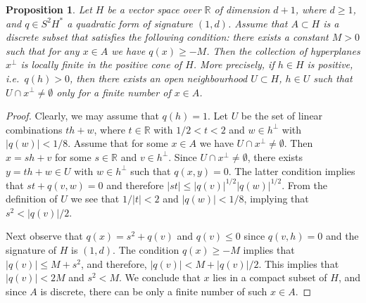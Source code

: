 \documentclass[11pt]{article}
\newcommand{\6}{\partial}
\newcommand{\bbR}{\mathbb{R}}
\renewcommand{\ge}{\geqslant}
\renewcommand{\le}{\leqslant}
\newcommand{\st}{\enskip |\enskip}
\newtheorem{prop}[defn]{Proposition}
\begin{document}
\begin{prop}\label{prop_loc_fin}
Let $H$ be a vector space over $\bbR$ of dimension $d+1$, where $d \ge 1$, and
$q\in S^2H^*$ a quadratic form of signature $(1,d)$. Assume that $A\subset H$
is a discrete subset that satisfies the following condition: there exists a constant
$M > 0$ such that for any $x\in A$ we have $q(x) \ge -M$.
Then the collection of hyperplanes $x^\perp$ is locally finite in the positive cone
of $H$. More precisely, if $h\in H$ is positive, i.e.\ $q(h)>0$, then there exists
an open neighbourhood $U\subset H$, $h\in U$ such that $U\cap x^\perp\neq\emptyset$
only for a finite number of $x\in A$.
\end{prop}
\begin{proof}
Clearly, we may assume that $q(h)=1$. Let $U$ be the set of linear
combinations $t h + w$, where $t\in \bbR$ with $1/2 < t < 2$ and $w\in h^\perp$ with $|q(w)| < 1/8$.
Assume that for some $x\in A$ we have $U\cap x^\perp\neq \emptyset$. Then
$x = sh+v$ for some $s\in\bbR$ and $v\in h^\perp$. Since $U\cap x^\perp\neq \emptyset$, there exists $y=th+w\in U$
with $w\in h^\perp$ such that $q(x,y) = 0$. The latter condition implies
that $st + q(v,w) = 0$ and therefore $|st| \le|q(v)|^{1/2}|q(w)|^{1/2}$. 
From the definition of $U$ we see that $1/|t| < 2$ and $|q(w)| < 1/8$,
implying that $s^2 < |q(v)|/2$.

Next observe that $q(x) = s^2 + q(v)$ and $q(v) \le 0$ since $q(v,h) = 0$ and the signature
of $H$ is $(1,d)$. The condition $q(x) \ge -M$ implies that $|q(v)| \le M + s^2$,
and therefore, $|q(v)| < M + |q(v)|/2$. This implies that $|q(v)|< 2M$
and $s^2 < M$. We conclude that $x$ lies in a compact subset of $H$,
and since $A$ is discrete, there can be only a finite number of such $x\in A$.
\end{proof}
\end{document}
